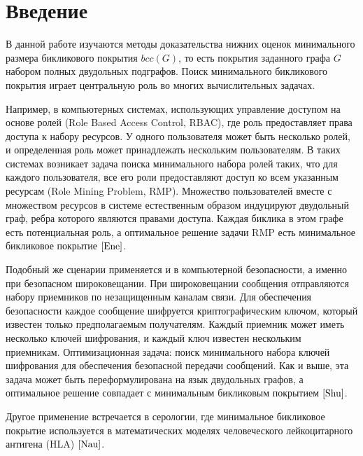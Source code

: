 \documentclass[a4paper]{article}
\begin{document}
\newpage

\tableofcontents

\newpage
 
\newpage

\setcounter{mclaim}{0}
\setcounter{mlemma}{0}
\setcounter{mtheorem}{0}
\setcounter{section}{0}
\section*{Введение}

В данной работе изучаются методы доказательства нижних оценок минимального размера бикликового покрытия $bcc(G)$,
то есть покрытия заданного графа $G$ набором полных двудольных подграфов. Поиск минимального бикликового 
покрытия играет центральную роль во многих вычислительных задачах. 

Например, в компьютерных системах, использующих управление 
доступом на основе ролей (Role Based Access Control, RBAC), где роль предоставляет права доступа к 
набору ресурсов. У одного пользователя может быть несколько ролей, и определенная роль может 
принадлежать нескольким пользователям. В таких системах возникает задача поиска минимального набора 
ролей таких, что для каждого пользователя, все его роли предоставляют доступ ко всем указанным 
ресурсам (Role Mining Problem, RMP). Множество пользователей вместе с множеством ресурсов 
в системе естественным образом индуцируют двудольный граф, ребра которого являются правами доступа. 
Каждая биклика в этом графе есть потенциальная роль, а оптимальное решение задачи RMP есть минимальное 
бикликовое покрытие $\cite{Ene}$.

Подобный же сценарии применяется и в компьютерной безопасности, а именно при безопасном широковещании.
При широковещании сообщения отправляются набору приемников по незащищенным каналам связи. Для обеспечения 
безопасности каждое сообщение шифруется криптографическим ключом, который известен только предполагаемым 
получателям. Каждый приемник может иметь несколько ключей шифрования, и каждый ключ известен нескольким 
приемникам. Оптимизационная задача: поиск минимального набора ключей шифрования для обеспечения безопасной 
передачи сообщений. Как и выше, эта задача может быть переформулирована на язык двудольных графов, 
а оптимальное решение совпадает с минимальным бикликовым покрытием $\cite{Shu}$.

Другое применение встречается в серологии, где минимальное бикликовое покрытие используется в 
математических моделях человеческого лейкоцитарного антигена (HLA) $\cite{Nau}$.
\end{document}
